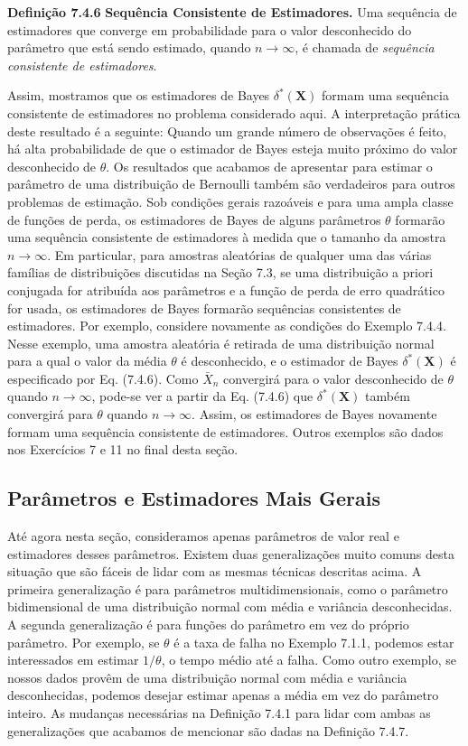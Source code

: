 \vspace{1cm}
\noindent\textbf{Definição 7.4.6} \quad \textbf{Sequência Consistente de Estimadores.} Uma sequência de estimadores que converge em probabilidade para o valor desconhecido do parâmetro que está sendo estimado, quando $n \to \infty$, é chamada de \textit{sequência consistente de estimadores}.

\vspace{1cm}
Assim, mostramos que os estimadores de Bayes $\delta^*(\mathbf{X})$ formam uma sequência consistente de estimadores no problema considerado aqui. A interpretação prática deste resultado é a seguinte: Quando um grande número de observações é feito, há alta probabilidade de que o estimador de Bayes esteja muito próximo do valor desconhecido de $\theta$.
Os resultados que acabamos de apresentar para estimar o parâmetro de uma distribuição de Bernoulli também são verdadeiros para outros problemas de estimação. Sob condições gerais razoáveis e para uma ampla classe de funções de perda, os estimadores de Bayes de alguns parâmetros $\theta$ formarão uma sequência consistente de estimadores à medida que o tamanho da amostra $n \to \infty$. Em particular, para amostras aleatórias de qualquer uma das várias famílias de distribuições discutidas na Seção 7.3, se uma distribuição a priori conjugada for atribuída aos parâmetros e a função de perda de erro quadrático for usada, os estimadores de Bayes formarão sequências consistentes de estimadores.
Por exemplo, considere novamente as condições do Exemplo 7.4.4. Nesse exemplo, uma amostra aleatória é retirada de uma distribuição normal para a qual o valor da média $\theta$ é desconhecido, e o estimador de Bayes $\delta^*(\mathbf{X})$ é especificado por Eq. (7.4.6). Como $\bar{X}_n$ convergirá para o valor desconhecido de $\theta$ quando $n \to \infty$, pode-se ver a partir da Eq. (7.4.6) que $\delta^*(\mathbf{X})$ também convergirá para $\theta$ quando $n \to \infty$. Assim, os estimadores de Bayes novamente formam uma sequência consistente de estimadores. Outros exemplos são dados nos Exercícios 7 e 11 no final desta seção.

\subsection*{Parâmetros e Estimadores Mais Gerais}
Até agora nesta seção, consideramos apenas parâmetros de valor real e estimadores desses parâmetros. Existem duas generalizações muito comuns desta situação que são fáceis de lidar com as mesmas técnicas descritas acima. A primeira generalização é para parâmetros multidimensionais, como o parâmetro bidimensional de uma distribuição normal com média e variância desconhecidas. A segunda generalização é para funções do parâmetro em vez do próprio parâmetro. Por exemplo, se $\theta$ é a taxa de falha no Exemplo 7.1.1, podemos estar interessados em estimar $1/\theta$, o tempo médio até a falha. Como outro exemplo, se nossos dados provêm de uma distribuição normal com média e variância desconhecidas, podemos desejar estimar apenas a média em vez do parâmetro inteiro.
As mudanças necessárias na Definição 7.4.1 para lidar com ambas as generalizações que acabamos de mencionar são dadas na Definição 7.4.7.

